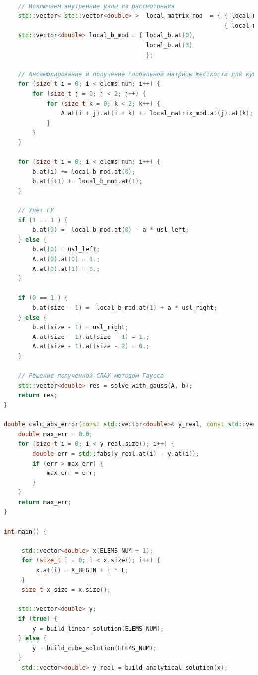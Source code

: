 \begin{lstlisting}[language=c++, label=prog,caption={\textit{Реализация МКЭ}}]
    
    // Исключаем внутренние узлы из рассмотрения
    std::vector< std::vector<double> >  local_matrix_mod  = { { local_matrix.at(0).at(0), local_matrix.at(0).at(3) },
                                                              { local_matrix.at(3).at(0), local_matrix.at(3).at(3) } };
    std::vector<double> local_b_mod = { local_b.at(0), 
                                        local_b.at(3)
                                        };
    
    // Ансамблирование и получение глобальной матрицы жесткости для кубического КЭ
    for (size_t i = 0; i < elems_num; i++) {
        for (size_t j = 0; j < 2; j++) {
            for (size_t k = 0; k < 2; k++) {
                A.at(i + j).at(i + k) += local_matrix_mod.at(j).at(k);
            }
        }
    }

    for (size_t i = 0; i < elems_num; i++) {
        b.at(i) += local_b_mod.at(0);
        b.at(i+1) += local_b_mod.at(1);
    }
       
    // Учет ГУ
    if (1 == 1 ) {
        b.at(0) =  local_b_mod.at(0) - a * usl_left;
    } else {
        b.at(0) = usl_left;
        A.at(0).at(0) = 1.;
        A.at(0).at(1) = 0.;
    }

    if (0 == 1 ) {
        b.at(size - 1) =  local_b_mod.at(1) + a * usl_right;
    } else {
        b.at(size - 1) = usl_right;
        A.at(size - 1).at(size - 1) = 1.;
        A.at(size - 1).at(size - 2) = 0.;
    }
    
    // Решение полученной СЛАУ методом Гаусса
    std::vector<double> res = solve_with_gauss(A, b);
    return res;
}

double calc_abs_error(const std::vector<double>& y_real, const std::vector<double>& y) {
    double max_err = 0.0;
    for (size_t i = 0; i < y_real.size(); i++) {
        double err = std::fabs(y_real.at(i) - y.at(i));
        if (err > max_err) {
            max_err = err;
        }
    }
    return max_err;
}

int main() {

     std::vector<double> x(ELEMS_NUM + 1);
     for (size_t i = 0; i < x.size(); i++) {
         x.at(i) = X_BEGIN + i * L;
     }
     size_t x_size = x.size();

    std::vector<double> y;
    if (true) {
        y = build_linear_solution(ELEMS_NUM);
    } else {
        y = build_cube_solution(ELEMS_NUM);
    }
     std::vector<double> y_real = build_analytical_solution(x);
    


\end{lstlisting}
